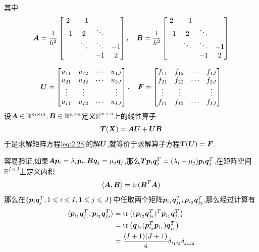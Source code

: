 其中
$$
\bm{A}=\frac{1}{h^2}
\begin{bmatrix}
2 & -1 & \quad & \quad\\
-1 & 2 & \ddots & \quad\\
\quad & \ddots & \ddots & -1\\
\quad & \quad & -1 & 2
\end{bmatrix}
,\quad 
\bm{B}=\frac{1}{k^2}
\begin{bmatrix}
2 & -1 & \quad & \quad\\
-1 & 2 & \ddots & \quad\\
\quad & \ddots & \ddots & -1\\
\quad & \quad & -1 & 2
\end{bmatrix}
$$

$$
\bm{U}=
\begin{bmatrix}
u_{11} & u_{12} & \cdots & u_{1J}\\
u_{21} & u_{22} & \cdots & u_{2J}\\
\vdots  & \vdots  & \quad & \vdots \\
u_{I1} & u_{I2} & \cdots & u_{IJ}\\
\end{bmatrix}
,\quad
\bm{F}=
\begin{bmatrix}
f_{11} & f_{12} & \cdots & f_{1J}\\
f_{21} & f_{22} & \cdots & f_{2J}\\
\vdots  & \vdots  & \quad & \vdots \\
f_{I1} & f_{I2} & \cdots & f_{IJ}\\
\end{bmatrix}
$$
\qquad 设$\bm{A}\in\mathbb{R}^{m\times m},\bm{B}\in\mathbb{R}^{n\times n}$定义$\mathbb{R}^{m\times n}$上的线性算子
$$
\bm{T}(\bm{X})=\bm{AU}+\bm{UB}
$$
于是求解矩阵方程\eqref{eq:2.28}的解$\bm{U}$,就等价于求解算子方程$\bm{T}(\bm{U})=\bm{F}$.\par
容易验证,如果$\bm{A}\bm{p}_i=\lambda_i\bm{p}_i,\bm{B}\bm{q}_j=\mu_j\bm{q}_j$,那么$\bm{T}\bm{p}_i\bm{q}_j^T=(\lambda_i+\mu_j)\bm{p}_i\bm{q}_j^T$.在矩阵空间$\mathbb{R}^{I\times J}$上定义内积
$$
\langle \bm{A},\bm{B}\rangle =\operatorname{tr}(\bm{B}^T\bm{A})
$$
那么在$\{\bm{p}_i\bm{q}_j^T,1\leqslant i\leqslant I,1\leqslant j\leqslant J\}$中任取两个矩阵$\bm{p}_{i_1}\bm{q}_{j_1}^T,\bm{p}_{i_2}\bm{q}_{j_2}^T$,那么经过计算有
$$
\begin{aligned}
    \langle \bm{p}_{i_1}\bm{q}_{j_1}^T, \bm{p}_{i_2}\bm{q}_{j_2}^T\rangle &= \operatorname{tr}\left((\bm{p}_{i_2}\bm{q}_{j_2}^T)^T\bm{p}_{i_1}\bm{q}_{j_1}^T\right)\\
                                                                                  &= \operatorname{tr} \left(\bm{q}_{j_2}(\bm{p}_{i_2}^T\bm{p}_{i_1})\bm{q}_{j_1}^T\right)\\
                                                                                  &= \frac{(I+1)(J+1)}{4}\delta_{i_{1}i_{2}}\delta_{j_{1}j_{2}}
\end{aligned}
$$
